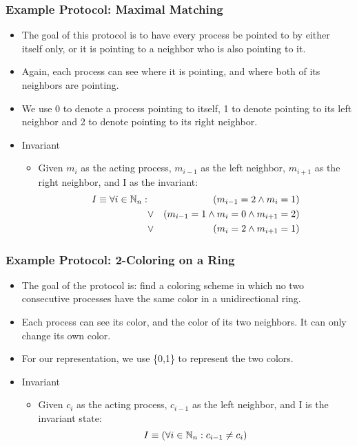 \documentclass[handout]{beamer}
\begin{document}
\begin{frame}
\frametitle{Example Protocol: Maximal Matching}
\begin{itemize}
\item The goal of this protocol is to have every process be pointed to by either itself only, or it
    is pointing to a neighbor who is also pointing to it.
\item Again, each process can see where it is pointing, and where both of its neighbors are
    pointing.
\item We use 0 to denote a process pointing to itself, 1 to denote pointing to its left neighbor
    and 2 to denote pointing to its right neighbor.
\item Invariant
 \begin{itemize}
 \item Given $m_i$ as the acting process, $m_{i-1}$ as the left neighbor, $m_{i+1}$ as the right
    neighbor, and I as the invariant:
  \begin{eqnarray*}
   I \equiv \forall i\in\mathbb{N}_n: & & (m_{i-1} = 2 \wedge m_i = 1)
                    \\ & \vee  & (m_{i-1} = 1 \wedge m_i = 0 \wedge m_{i+1} = 2)
                    \\ & \vee  & (m_i = 2 \wedge m_{i+1} = 1)
  \end{eqnarray*}
 \end{itemize}
\end{itemize}
\end{frame}

\begin{frame}
\frametitle{Example Protocol: 2-Coloring on a Ring}
\begin{itemize}
\item The goal of the protocol is: find a coloring scheme in which no two consecutive processes have the same color in a unidirectional ring.
\item Each process can see its color, and the color of its two neighbors.  It can only change its own color.
\item For our representation, we use \{0,1\} to represent the two colors.
\item Invariant
 \begin{itemize}
 \item Given $c_i$ as the acting process, $c_{i-1}$ as the left neighbor, and I is the invariant state: 
    \[ I \equiv (\forall i\in\mathbb{N}_n: c_{i-1}\ne c_i) \]
 \end{itemize}
\end{itemize}
\end{frame}
\end{document}
